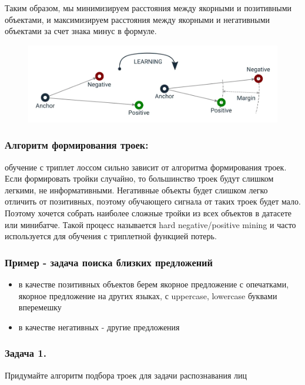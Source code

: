 Таким образом, мы минимизируем расстояния между якорными и позитивными объектами,
и максимизируем расстояния между якорными и негативными объектами за счет знака минус в формуле.

\begin{figure}[h]
    \centering
    \includegraphics[scale=0.5]{chapters/nonstandart_error/images/triplet_loss_learning.png}
\end{figure}

\subsubsection*{Алгоритм формирования троек:}

обучение с триплет лоссом сильно зависит от алгоритма формирования троек.
Если формировать тройки случайно, то большинство троек будут слишком легкими, не информативными.
Негативные объекты будет слишком легко отличить от позитивных, поэтому обучающего сигнала от таких троек будет мало.
Поэтому хочется собрать наиболее сложные тройки из всех объектов в датасете или минибатче.
Такой процесс называется hard negative/positive mining и часто используется для обучения с триплетной функцией потерь.

\subsubsection*{Пример - задача поиска близких предложений}
\begin{itemize}
    \item в качестве позитивных объектов берем якорное предложение с опечатками, якорное предложение на других языках, с uppercase, lowercase буквами вперемешку
    \item в качестве негативных - другие предложения
\end{itemize}

\subsubsection*{Задача 1.}

Придумайте алгоритм подбора троек для задачи распознавания лиц

